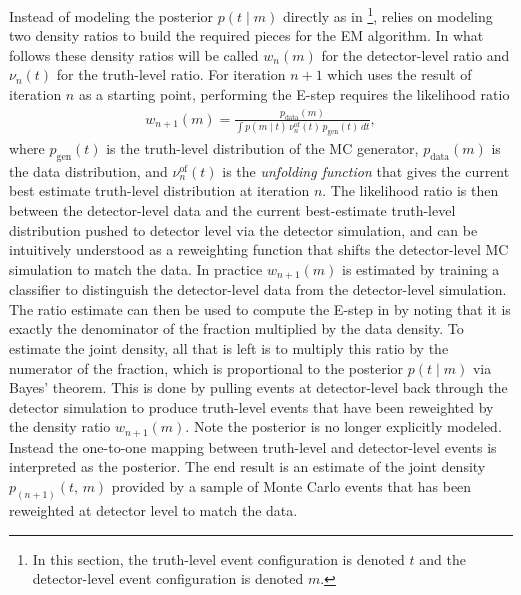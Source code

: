 Instead of modeling the posterior $p(t \mid m)$ directly as in \footnote{In this section, the truth-level event configuration is denoted $t$ and the detector-level event configuration is denoted $m$.}, \Omnifold relies on modeling two density ratios to build the required pieces for the EM algorithm.
In what follows these density ratios will be called $w_{n}(m)$ for the detector-level ratio and $\nu_{n}(t)$ for the truth-level ratio.
For iteration $n+1$ which uses the result of iteration $n$ as a starting point, performing the E-step requires the likelihood ratio
\begin{align}
\label{eq:omnifold-estep}
w_{n+1}(m) = \frac{p_{\mathrm{data}}(m)}{\displaystyle\int p(m \mid t)\, \nu^{\mathrm{of}}_{n}(t)\, p_{\mathrm{gen}}(t)\, dt},
\end{align}
where $p_{\mathrm{gen}}(t)$ is the truth-level distribution of the MC generator, $p_{\mathrm{data}}(m)$ is the data distribution, and $\nu^{\mathrm{of}}_{n}(t)$ is the \textit{unfolding function} that gives the current best estimate truth-level distribution at iteration $n$.
The likelihood ratio is then between the detector-level data and the current best-estimate truth-level distribution pushed to detector level via the detector simulation, and can be intuitively understood as a reweighting function that shifts the detector-level MC simulation to match the data.
In practice $w_{n+1}(m)$ is estimated by training a classifier to distinguish the detector-level data from the detector-level simulation.
The ratio estimate can then be used to compute the E-step in  by noting that it is exactly the denominator of the fraction multiplied by the data density.
To estimate the joint density, all that is left is to multiply this ratio by the numerator of the fraction, which is proportional to the posterior $p(t \mid m)$ via Bayes' theorem.
This is done by pulling events at detector-level back through the detector simulation to produce truth-level events that have been reweighted by the density ratio $w_{n+1}(m)$.
Note the posterior is no longer explicitly modeled.
Instead the one-to-one mapping between truth-level and detector-level events is interpreted as the posterior.
The end result is an estimate of the joint density $p_{(n+1)}(t, \, m)$ provided by a sample of Monte Carlo events that has been reweighted at detector level to match the data.

